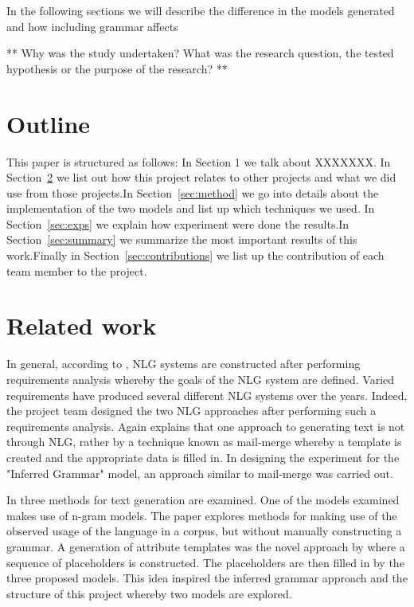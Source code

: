 \documentclass[a4paper,12pt]{article}
\begin{document}
In the following sections we will describe the difference in the models generated and how including grammar affects


**
Why was the study undertaken? What was the research question, the tested hypothesis or the purpose of the research?
**


\section{Outline}
This paper is structured as follows: In Section 1 we talk about XXXXXXX. In Section~\ref{sec:relwork} we list out how this project relates to other projects and what we did use from those projects.In Section~\ref{sec:method} we go into details about the implementation of the two models and list up which techniques we used. In Section~\ref{sec:exps} we explain how experiment were done the results.In Section~\ref{sec:summary} we summarize the most important results of this work.Finally in Section~\ref{sec:contributions} we list up the contribution of each team member to the project.

\section{Related work}
\label{sec:relwork}

In general, according to \cite{Reiter:2000:BNL:331955}, NLG systems are constructed after performing requirements analysis whereby the goals of the NLG system are defined. Varied requirements have produced several different NLG systems over the years. Indeed, the project team designed the two NLG approaches after performing such a requirements analysis. Again \cite{Reiter:2000:BNL:331955} explains that one approach to generating text is not through NLG, rather by a technique known as mail-merge whereby a template is created and the appropriate data is filled in. In designing the experiment for the "Inferred Grammar" model, an approach similar to mail-merge was carried out.

In \cite{Ratnaparkhi00} three methods for text generation are examined. One of the models examined makes use of n-gram models. The paper explores methods for making use of the observed usage of the language in a corpus, but without manually constructing a grammar. A generation of attribute templates was the novel approach by \cite{Ratnaparkhi00} where a sequence of placeholders is constructed. The placeholders are then filled in by the three proposed models. This idea inspired the inferred grammar approach and the structure of this project whereby two models are explored.
\end{document}
